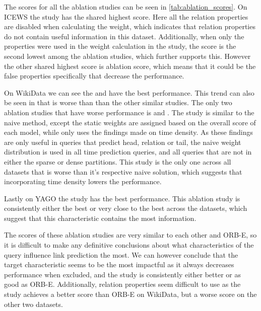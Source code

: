 The scores for all the ablation studies can be seen in \autoref{tab:ablation_scores}. On ICEWS the  study has the shared highest score. 
Here all the relation properties are disabled when calculating the weight, which indicates that relation properties do not contain useful information in this dataset. Additionally, when only the properties were used in the weight calculation in the  study, the score is the second lowest among the ablation studies, which further supports this. However the other shared highest score is  ablation score, which means that it could be the false properties specifically that decrease the performance. 




On WikiData we can see the  and  have the best performance. This trend can also be seen in that  is worse than than the other similar studies. The only two ablation studies that have worse performance is  and . The  study is similar to the naive method, except the static weights are assigned based on the overall score of each model, while  only uses the findings made on time density. As these findings are only useful in queries that predict head, relation or tail, the naive weight distribution is used in all time prediction queries, and all queries that are not in either the sparse or dense partitions. This study is the only one across all datasets that is worse than it's respective naive solution, which suggests that incorporating time density lowers the performance. 

Lastly on YAGO the study  has the best performance. This ablation study is consistently either the best or very close to the best across the datasets, which suggest that this characteristic contains the most information. 

The scores of these ablation studies are very similar to each other and ORB-E, so it is difficult to make any definitive conclusions about what characteristics of the query influence link prediction the most.
We can however conclude that the target characteristic seems to be the most impactful as it always decreases performance when excluded, and the study  is consistently either better or as good as ORB-E. 
Additionally, relation properties seem difficult to use as the study  achieves a better score than ORB-E on WikiData, but a worse score on the other two datasets.